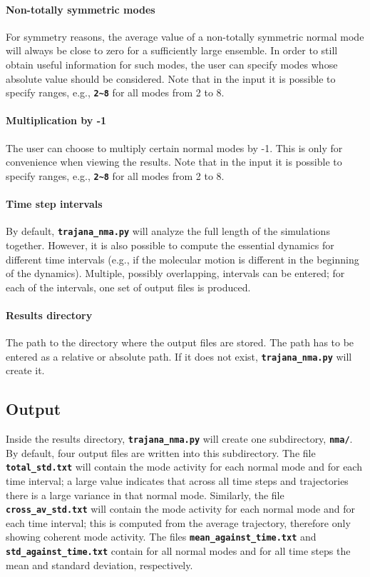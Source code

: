 \documentclass[a4paper,10pt,DIV=15,openany]{scrbook}
\newcommand{\ttt}[1]{\textbf{\texttt{#1}}}
\begin{document}
\paragraph{Non-totally symmetric modes}

For symmetry reasons, the average value of a non-totally symmetric normal mode will always be close to zero for a sufficiently large ensemble.
In order to still obtain useful information for such modes, the user can specify modes whose absolute value should be considered.
Note that in the input it is possible to specify ranges, e.g., \ttt{2\textasciitilde8} for all modes from 2 to 8.

\paragraph{Multiplication by -1}

The user can choose to multiply certain normal modes by -1.
This is only for convenience when viewing the results.
Note that in the input it is possible to specify ranges, e.g., \ttt{2\textasciitilde8} for all modes from 2 to 8.

\paragraph{Time step intervals}

By default, \ttt{trajana\_nma.py} will analyze the full length of the simulations together. 
However, it is also possible to compute the essential dynamics for different time intervals (e.g., if the molecular motion is different in the beginning of the dynamics).
Multiple, possibly overlapping, intervals can be entered; for each of the intervals, one set of output files is produced.

\paragraph{Results directory}

The path to the directory where the output files are stored.
The path has to be entered as a relative or absolute path.
If it does not exist, \ttt{trajana\_nma.py} will create it.

\subsection{Output}

Inside the results directory, \ttt{trajana\_nma.py} will create one subdirectory, \ttt{nma/}.
By default, four output files are written into this subdirectory.
The file \ttt{total\_std.txt} will contain the mode activity for each normal mode and for each time interval; a large value indicates that across all time steps and trajectories there is a large variance in that normal mode.
Similarly, the file \ttt{cross\_av\_std.txt} will contain the mode activity for each normal mode and for each time interval; this is computed from the average trajectory, therefore only showing coherent mode activity.
The files \ttt{mean\_against\_time.txt} and \ttt{std\_against\_time.txt} contain for all normal modes and for all time steps the mean and standard deviation, respectively.
\end{document}
